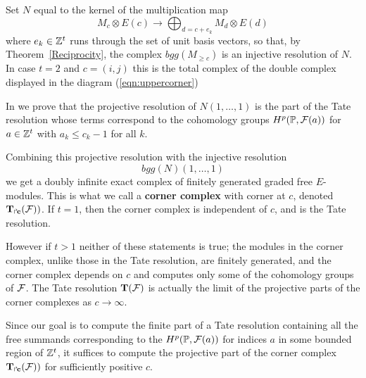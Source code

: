\documentclass[twoside,12pt, leqno]{amsart}
\def\PP{{\mathbb P}}
\def\cornerT#1{{T_{\Rsh \kern -1pt #1}}}
\def\bT{{\bf T}}
\begin{document}
Set $N$ equal to the kernel of the multiplication map
$$ 
M_c \otimes E(c) \to \bigoplus_{d=c+e_k}M_{d} \otimes E(d) 
$$
where $e_k \in {\mathbb Z}^t$ runs through the set of unit basis vectors,
so that, by Theorem~\ref{Reciprocity}, the complex $bgg(M_{\ge c})$ is an injective resolution of $N$.
In case $t=2$ and $c=(i,j)$ this is the total complex of the double complex displayed in the diagram (\ref{eqn:uppercorner})
 
In \cite{EES} we prove that
the projective resolution of $N(1,\ldots,1)$ is the part of the Tate resolution whose terms correspond to the cohomology groups
$H^p(\PP, \sF(a))$ for  $a \in {\mathbb Z}^t$ with $a_k\le c_k -1$ for all $k$. 

Combining this projective resolution  
 with the injective resolution 
 $$
 bgg(N)(1,\ldots,1)
 $$
   we get a doubly infinite exact complex of finitely generated graded free $E$-modules.
This is what we call a {\bf corner complex} with corner at $c$, denoted
${\bf \cornerT c} (\sF))$. If $t=1$, then the corner complex
is independent of $c$, and is the Tate resolution. 

However if $t>1$ neither of these statements is true; the modules in the corner complex, unlike those in the Tate resolution, are finitely generated, and the corner complex depends  on $c$ and computes only
some of the cohomology groups of ${\mathcal F}$. The Tate resolution  $\bT(\sF)$ is actually 
 the limit of the projective parts of the corner complexes as  $c \to \infty$.
 
 Since our goal is to compute the finite part of a Tate resolution containing all the free summands corresponding to the $H^p(\PP, \sF(a))$ for  indices $a$ in some bounded region of ${\mathbb Z}^t$, 
it suffices to compute the projective part of the corner complex ${\bf \cornerT c} (\sF))$ for sufficiently
positive $c$.
\end{document}
